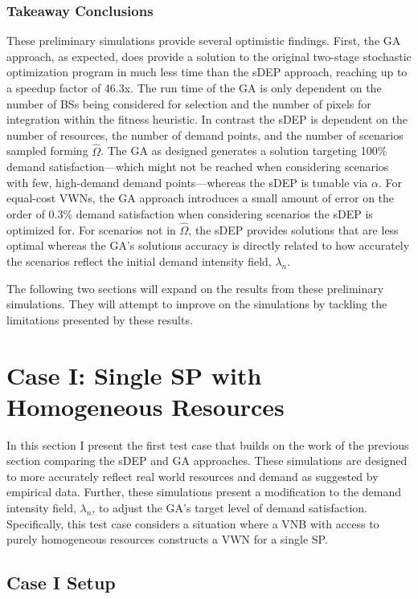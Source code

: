 \documentclass[12pt,dvipsnames]{report}
\begin{document}
\subsubsection{Takeaway Conclusions}

These preliminary simulations provide several optimistic findings.  First, the GA approach, as expected, does provide a solution to the original two-stage stochastic optimization program in much less time than the sDEP approach, reaching up to a speedup factor of 46.3x.  The run time of the GA is only dependent on the number of BSs being considered for selection and the number of pixels for integration within the fitness heuristic.  In contrast the sDEP is dependent on the number of resources, the number of demand points, and the number of scenarios sampled forming $\hat{\Omega}$.  The GA as designed generates a solution targeting 100\% demand satisfaction---which might not be reached when considering scenarios with few, high-demand demand points---whereas the sDEP is tunable via $\alpha$.  For equal-cost VWNs, the GA approach introduces a small amount of error on the order of 0.3\% demand satisfaction when considering scenarios the sDEP is optimized for.  For scenarios not in $\hat{\Omega}$, the sDEP provides solutions that are less optimal whereas the GA's solutions accuracy is directly related to how accurately the scenarios reflect the initial demand intensity field, $\lambda_n$.

The following two sections will expand on the results from these preliminary simulations.  They will attempt to improve on the simulations by tackling the limitations presented by these results.

\section{Case I: Single SP with Homogeneous Resources} \label{sec:caseI}

In this section I present the first test case that builds on the work of the previous section comparing the sDEP and GA approaches.  These simulations are designed to more accurately reflect real world resources and demand as suggested by empirical data.  Further, these simulations present a modification to the demand intensity field, $\lambda_n$, to adjust the GA's target level of demand satisfaction.  Specifically, this test case considers a situation where a VNB with access to purely homogeneous resources constructs a VWN for a single SP.

\subsection{Case I Setup} \label{subsec:caseI_setup}
\end{document}
